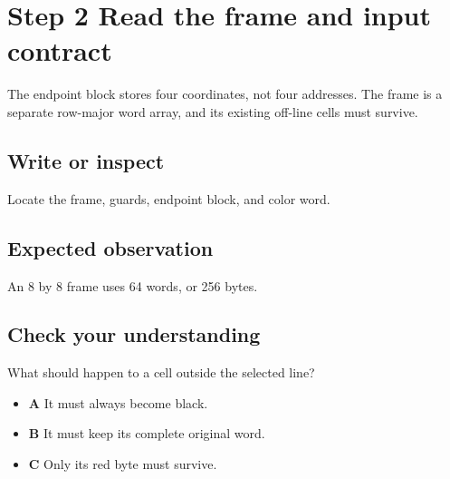 \section{Step 2 Read the frame and input
  contract}\label{007-bresenham-line-s02-step-2-read-the-frame-and-input-contract}

The endpoint block stores four coordinates, not four addresses. The
frame is a separate row-major word array, and its existing off-line
cells must survive.

\subsection{Write or
  inspect}\label{007-bresenham-line-s02-write-or-inspect}

Locate the frame, guards, endpoint block, and color word.

\subsection{Expected
  observation}\label{007-bresenham-line-s02-expected-observation}

An 8 by 8 frame uses 64 words, or 256 bytes.

\subsection{Check your
  understanding}\label{007-bresenham-line-s02-check-your-understanding}

What should happen to a cell outside the selected line?

\begin{itemize}
  \tightlist
  \item
        \textbf{A} It must always become black.
  \item
        \textbf{B} It must keep its complete original word.
  \item
        \textbf{C} Only its red byte must survive.
\end{itemize}
